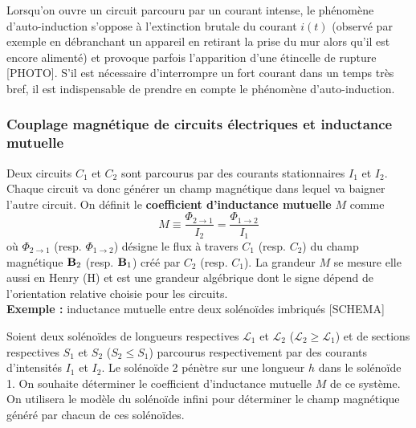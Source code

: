 \documentclass[11pt,a4paper]{report}
\begin{document}
Lorsqu'on ouvre un circuit parcouru par un courant intense, le phénomène d'auto-induction s'oppose à l'extinction brutale du courant $i(t)$ (observé par exemple en débranchant un appareil en retirant la prise du mur alors qu'il est encore alimenté) et provoque parfois l'apparition d'une étincelle de rupture [PHOTO]. S'il est nécessaire d'interrompre un fort courant dans un temps très bref, il est indispensable de prendre en compte le phénomène d'auto-induction.

\subsubsection{Couplage magnétique de circuits électriques et inductance mutuelle}

Deux circuits $C_1$ et $C_2$ sont parcourus par des courants stationnaires $I_1$ et $I_2$. Chaque circuit va donc générer un champ magnétique dans lequel va baigner l'autre circuit. On définit le \textbf{coefficient d'inductance mutuelle} $M$ comme
\begin{equation}
	M \equiv \frac{\Phi_{2\rightarrow 1}}{I_2} = \frac{\Phi_{1\rightarrow 2}}{I_1}
\end{equation}
où $\Phi_{2\rightarrow 1}$ (resp. $\Phi_{1\rightarrow 2}$) désigne le flux à travers $C_1$ (resp. $C_2$) du champ magnétique $\bold{B}_2$ (resp. $\bold{B}_1$) créé par $C_2$ (resp. $C_1$). La grandeur $M$ se mesure elle aussi en Henry (H) et est une grandeur algébrique dont le signe dépend de l'orientation relative choisie pour les circuits.\\

\textbf{Exemple :} inductance mutuelle entre deux solénoïdes imbriqués [SCHEMA]

Soient deux solénoïdes de longueurs respectives $\mathcal{L}_1$ et $\mathcal{L}_2$ ($\mathcal{L}_2 \geq \mathcal{L}_1$) et de sections respectives $S_1$ et $S_2$ ($S_2 \leq S_1$) parcourus respectivement par des courants d'intensités $I_1$ et $I_2$. Le solénoïde 2 pénètre sur une longueur $h$ dans le solénoïde 1. On souhaite déterminer le coefficient d'inductance mutuelle $M$ de ce système. On utilisera le modèle du solénoïde infini pour déterminer le champ magnétique généré par chacun de ces solénoïdes.
\end{document}
